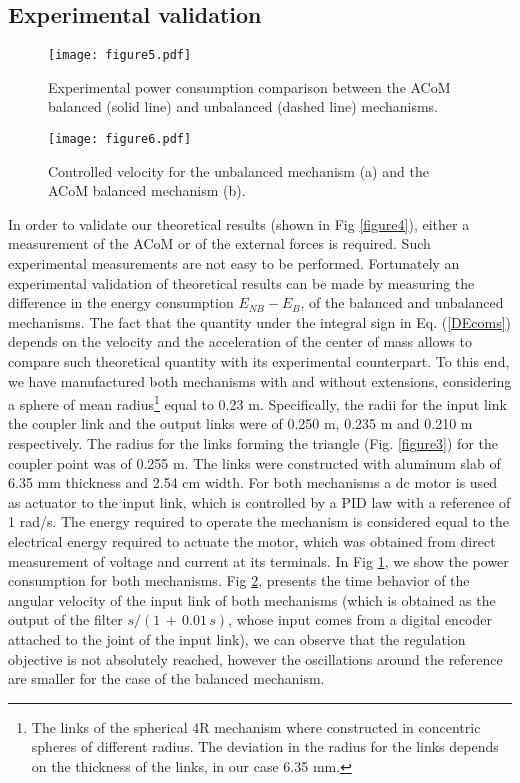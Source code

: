 \documentclass[11pt]{article}
\begin{document}
\subsection{Experimental validation}
\begin{figure}[htb]
\begin{center}
\texttt{[image: figure5.pdf]} 
\caption{Experimental power consumption comparison between the ACoM 
balanced (solid line) and unbalanced (dashed line) mechanisms.}
\label{figure5}
\end{center}
\end{figure}
\begin{figure}[htb]
\begin{center}
\texttt{[image: figure6.pdf]} 
\caption{Controlled velocity for the unbalanced mechanism (a) 
and the ACoM balanced mechanism (b).}
\label{figure6}
\end{center}
\end{figure}
In order to validate our theoretical results (shown in Fig 
\ref{figure4}), either a measurement of the ACoM or of the external 
forces is required. Such experimental measurements are not easy to be 
performed. Fortunately an experimental validation of theoretical results 
can be made by measuring the difference in the energy consumption  
$E_{NB}-E_{B}$, of the balanced and unbalanced mechanisms. The fact 
that the quantity under the integral sign in Eq. (\ref{DEcoms}) depends 
on the velocity and the acceleration of the center of mass allows to 
compare such theoretical quantity with its experimental counterpart.
To this end, we have manufactured 
both mechanisms with and without extensions, considering a sphere of 
mean radius\footnote{The links of the spherical 4R mechanism where 
constructed in concentric spheres of different radius. The deviation in 
the radius for the links depends on the thickness of the links, in our 
case 6.35 mm.} equal to 0.23 m. Specifically, the radii for the input link 
the coupler link and the output links were of 0.250 m, 0.235 m and 0.210 m 
respectively. The radius for the links forming the triangle (Fig. \ref{figure3}) 
for the coupler point was of 0.255 m.
The links were constructed with aluminum 
slab of 6.35 mm thickness and 2.54 cm width. For both mechanisms a dc 
motor is used as actuator to the input link, which is controlled by a 
PID law with a reference of 1 rad/s. The energy required to operate the 
mechanism is considered equal to the electrical energy required to 
actuate the motor, which was obtained from direct measurement of voltage 
and current at its terminals. In Fig \ref{figure5}, we show the power 
consumption for both mechanisms. Fig \ref{figure6}, presents the time 
behavior of the angular velocity of the input link of both mechanisms 
(which is obtained as the output of the filter $s/(1\,+\,0.01\, s)$, 
whose input comes from a digital encoder attached to the joint of the 
input link), we can observe that the regulation objective is not 
absolutely reached, however the oscillations around the reference are 
smaller for the case of the balanced mechanism. 
\end{document}
